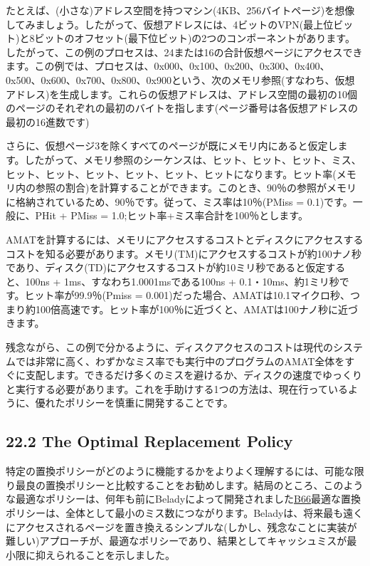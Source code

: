 たとえば、(小さな)アドレス空間を持つマシン(4KB、256バイトページ)を想像してみましょう。したがって、仮想アドレスには、4ビットのVPN(最上位ビット)と8ビットのオフセット(最下位ビット)の2つのコンポーネントがあります。したがって、この例のプロセスは、24または16の合計仮想ページにアクセスできます。この例では、プロセスは、0x000、0x100、0x200、0x300、0x400、0x500、0x600、0x700、0x800、0x900という、次のメモリ参照(すなわち、仮想アドレス)を生成します。これらの仮想アドレスは、アドレス空間の最初の10個のページのそれぞれの最初のバイトを指します(ページ番号は各仮想アドレスの最初の16進数です)

さらに、仮想ページ3を除くすべてのページが既にメモリ内にあると仮定します。したがって、メモリ参照のシーケンスは、ヒット、ヒット、ヒット、ミス、ヒット、ヒット、ヒット、ヒット、ヒット、ヒットになります。ヒット率(メモリ内の参照の割合)を計算することができます。このとき、90％の参照がメモリに格納されているため、90％です。従って、ミス率は10％(PMiss
= 0.1)です。一般に、PHit + PMiss =
1.0;ヒット率+ミス率合計を100％とします。

AMATを計算するには、メモリにアクセスするコストとディスクにアクセスするコストを知る必要があります。メモリ(TM)にアクセスするコストが約100ナノ秒であり、ディスク(TD)にアクセスするコストが約10ミリ秒であると仮定すると、100ns
+ 1ms、すなわち1.0001msである100ns +
0.1・10ms、約1ミリ秒です。ヒット率が99.9％(Pmiss =
0.001)だった場合、AMATは10.1マイクロ秒、つまり約100倍高速です。ヒット率が100％に近づくと、AMATは100ナノ秒に近づきます。

残念ながら、この例で分かるように、ディスクアクセスのコストは現代のシステムでは非常に高く、わずかなミス率でも実行中のプログラムのAMAT全体をすぐに支配します。できるだけ多くのミスを避けるか、ディスクの速度でゆっくりと実行する必要があります。これを手助けする1つの方法は、現在行っているように、優れたポリシーを慎重に開発することです。

\hypertarget{the-optimal-replacement-policy}{%
\subsection*{22.2 The Optimal Replacement
Policy}\label{the-optimal-replacement-policy}}

特定の置換ポリシーがどのように機能するかをよりよく理解するには、可能な限り最良の置換ポリシーと比較することをお勧めします。結局のところ、このような最適なポリシーは、何年も前にBeladyによって開発されました\href{彼はもともとMINと呼ばれていた}{B66}最適な置換ポリシーは、全体として最小のミス数につながります。Beladyは、将来最も遠くにアクセスされるページを置き換えるシンプルな(しかし、残念なことに実装が難しい)アプローチが、最適なポリシーであり、結果としてキャッシュミスが最小限に抑えられることを示しました。

